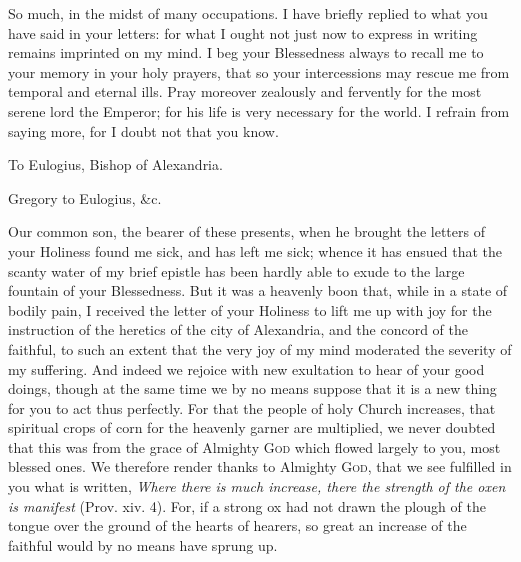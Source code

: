 So much, in the midst of many occupations. I have briefly replied to what you have said in your letters: for what I ought not just now to express in writing remains imprinted on my mind. I beg your Blessedness always to recall me to your memory in your holy prayers, that so your intercessions may rescue me from temporal and eternal ills. Pray moreover zealously and fervently for the most serene lord the Emperor; for his life is very necessary for the world. I refrain from saying more, for I doubt not that you know.


To Eulogius, Bishop of Alexandria.

Gregory to Eulogius, \&c.

Our common son, the bearer of these presents, when he brought the letters of your Holiness found me sick, and has left me sick; whence it has ensued that the scanty water of my brief epistle has been hardly able to exude to the large fountain of your Blessedness. But it was a heavenly boon that, while in a state of bodily pain, I received the letter of your Holiness to lift me up with joy for the instruction of the heretics of the city of Alexandria, and the concord of the faithful, to such an extent that the very joy of my mind moderated the severity of my suffering. And indeed we rejoice with new exultation to hear of your good doings, though at the same time we by no means suppose that it is a new thing for you to act thus perfectly. For that the people of holy Church increases, that spiritual crops of corn for the heavenly garner are multiplied, we never doubted that this was from the grace of Almighty \textsc{God} which flowed largely to you, most blessed ones. We therefore render thanks to Almighty \textsc{God}, that we see fulfilled in you what is written, \emph{Where there is much increase, there the strength of the oxen is manifest} (Prov. xiv. 4). For, if a strong ox had not drawn the plough of the tongue over the ground of the hearts of hearers, so great an increase of the faithful would by no means have sprung up.


